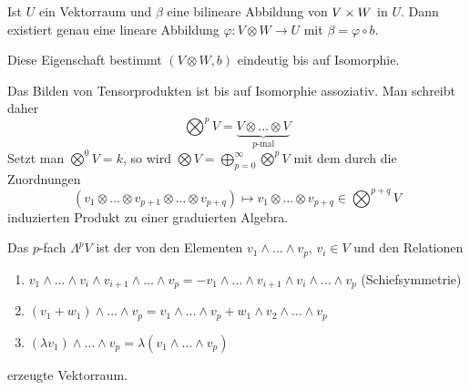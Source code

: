 \begin{emptythm}
Ist $U$ ein Vektorraum und $\beta$ eine bilineare Abbildung von $V \times W$ in $U$. Dann existiert genau eine lineare Abbildung $\varphi: V \otimes W \to U$ mit $\beta = \varphi \circ b$.
\begin{center}\end{center}
Diese Eigenschaft bestimmt $(V \otimes W, b)$ eindeutig bis auf Isomorphie.
\end{emptythm}

Das Bilden von Tensorprodukten ist bis auf Isomorphie assoziativ. Man schreibt daher
	\[ \bigotimes^p V = \underbrace{V \otimes \ldots \otimes V}_{p\text{-mal}} \]
Setzt man $\bigotimes^0 V = k$, so wird $\bigotimes V = \bigoplus_{p=0}^{\infty} \bigotimes^p V$ mit dem durch die Zuordnungen
	\[ (v_1 \otimes \ldots \otimes v_{p+1} \otimes \ldots \otimes v_{p+q}) \mapsto v_1 \otimes \ldots \otimes v_{p+q} \in \bigotimes^{p+q} V \]
induzierten Produkt zu einer graduierten Algebra.

Das $p$-fach  $\Lambda^pV$ ist der von den Elementen $v_1 \wedge \ldots \wedge v_p$, $v_i \in V$ und den Relationen \begin{enumerate}[label=(\roman*),widest=iii]
\item
	$v_1 \wedge \ldots \wedge v_i \wedge v_{i+1} \wedge \ldots \wedge v_p = - v_1 \wedge \ldots \wedge v_{i+1} \wedge v_i \wedge \ldots \wedge v_p$ (Schiefsymmetrie)
\item
	$(v_1 + w_1) \wedge \ldots \wedge v_p = v_1 \wedge \ldots \wedge v_p + w_1 \wedge v_2 \wedge \ldots \wedge v_p$
\item
	$(\lambda v_1) \wedge \ldots \wedge v_p = \lambda (v_1 \wedge \ldots \wedge v_p)$
\end{enumerate}
erzeugte Vektorraum.

